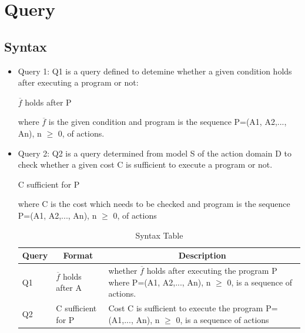 \documentclass[11pt]{article}
\begin{document}
\section{Query}
\subsection{Syntax}
\begin{itemize}
\item{Query 1: Q1 is a query defined to detemine whether a given condition holds after executing a program or not:
\begin{center}
	$\overline{f}$ holds after P
\end{center}
where $\overline{f}$ is the given condition and program is the sequence P=(A1, A2,..., An), n $\geq$ 0, of actions.
}
\item{Query 2: Q2 is a query determined from model S of the action domain D to check whether a given cost C is sufficient to execute a program or not.
\begin{center}
	C sufficient for P
\end{center}
where C is the cost which needs to be checked and program is the sequence P=(A1, A2,..., An), n $\geq$ 0, of actions
}

\begin{table}[H]
	\centering
	\begin{tabular}{|p{2cm}|p{4cm}|p{7cm}|}
		\hline
		\multicolumn{1}{|c|}{\textbf{Query}} & \multicolumn{1}{c|}{\textbf{Format}} & \multicolumn{1}{c|}{\textbf{Description}} \\
		\hline
		Q1 & $\overline{f}$ holds after A & whether $\overline{f}$ holds after executing the program P where P=(A1, A2,..., An), n $\geq$ 0, is a sequence of actions.\\
		\hline
		Q2 & C sufficient for P & Cost C is sufficient to execute the program P=(A1,..., An), n $\geq$ 0, is a sequence of actions\\
		\hline
	\end{tabular}
	\caption{Syntax Table}
	\label{tab:table01}
\end{table}
\end{itemize}
\end{document}
